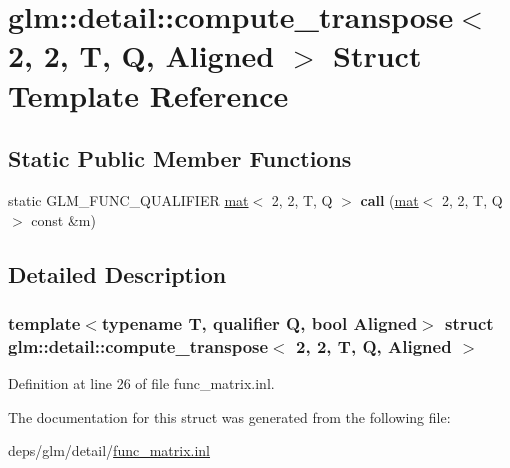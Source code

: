 \hypertarget{structglm_1_1detail_1_1compute__transpose_3_012_00_012_00_01T_00_01Q_00_01Aligned_01_4}{}\section{glm\+:\+:detail\+:\+:compute\+\_\+transpose$<$ 2, 2, T, Q, Aligned $>$ Struct Template Reference}
\label{structglm_1_1detail_1_1compute__transpose_3_012_00_012_00_01T_00_01Q_00_01Aligned_01_4}
\subsection*{Static Public Member Functions}
\begin{DoxyCompactItemize}
\item 
\mbox{\label{structglm_1_1detail_1_1compute__transpose_3_012_00_012_00_01T_00_01Q_00_01Aligned_01_4_ab78382e27d6683e2a71805ef245a3ac0}} 
static G\+L\+M\+\_\+\+F\+U\+N\+C\+\_\+\+Q\+U\+A\+L\+I\+F\+I\+ER \hyperlink{structglm_1_1mat}{mat}$<$ 2, 2, T, Q $>$ {\bfseries call} (\hyperlink{structglm_1_1mat}{mat}$<$ 2, 2, T, Q $>$ const \&m)
\end{DoxyCompactItemize}


\subsection{Detailed Description}
\subsubsection*{template$<$typename T, qualifier Q, bool Aligned$>$\newline
struct glm\+::detail\+::compute\+\_\+transpose$<$ 2, 2, T, Q, Aligned $>$}



Definition at line 26 of file func\+\_\+matrix.\+inl.



The documentation for this struct was generated from the following file\+:\begin{DoxyCompactItemize}
\item 
deps/glm/detail/\hyperlink{func__matrix_8inl}{func\+\_\+matrix.\+inl}\end{DoxyCompactItemize}
